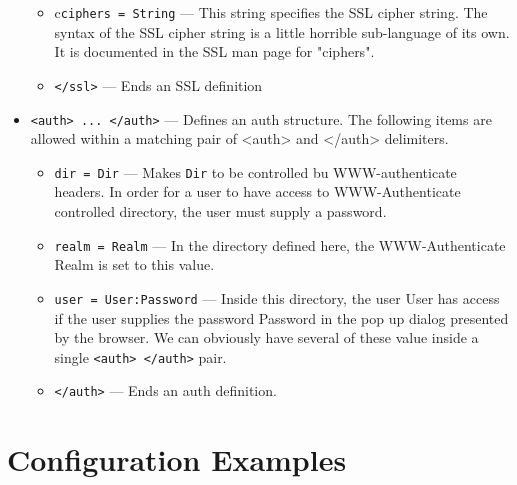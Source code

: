 \documentclass[11pt,oneside,english]{book}
\begin{document}
\begin{itemize}
\begin{itemize}
\item        c\verb+ciphers = String+ ---
              This  string  specifies  the  SSL  cipher
              string.  The syntax of the SSL cipher string
              is a little horrible sub-language of its own.
              It  is  documented  in  the SSL man page for
              "ciphers".

\item        \verb+</ssl>+ ---
              Ends an SSL definition
\end{itemize}


\item       \verb+<auth> ... </auth>+ ---
              Defines an  auth  structure.  The  following
              items  are allowed within a matching pair of
              <auth> and </auth> delimiters.

\begin{itemize}

\item       \verb+dir = Dir+ ---
              Makes \verb+Dir+ to be controlled bu  WWW-authenticate
              headers.  In  order for a user to have
              access to WWW-Authenticate controlled  directory,
              the user must supply a password.

\item       \verb+realm = Realm+ ---
              In  the  directory  defined  here,  the WWW-Authenticate
              Realm is set to this value.

\item       \verb+user = User:Password+ ---
              Inside this directory,  the  user  User  has
              access  if  the  user  supplies the password
              Password in the pop up dialog presented  by
              the  browser.  We can obviously have several
              of  these  value  inside  a  single
              \verb+<auth> </auth>+ pair.

\item       \verb+</auth>+ ---
              Ends an auth definition.


\end{itemize}

\end{itemize}




\section{Configuration Examples}
\end{document}

